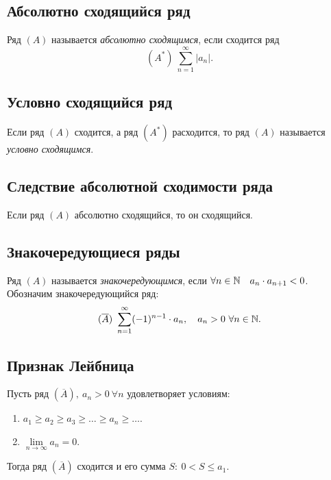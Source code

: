 \subsection{Абсолютно сходящийся ряд}

\begin{definition}
    Ряд $(A)$ называется \emph{абсолютно сходящимся}, если сходится ряд
    \[
        (A^*) \ \sum_{n=1}^{\infty}|a_n|.
    \]
\end{definition}

\subsection{Условно сходящийся ряд}

\begin{definition}
    Если ряд $(A)$ сходится, а ряд $(A^*)$ расходится, то ряд $(A)$ называется \emph{условно сходящимся}.
\end{definition}

\subsection{Следствие абсолютной сходимости ряда}

\begin{statement}
    Если ряд $(A)$ абсолютно сходящийся, то он сходящийся.
\end{statement}

\subsection{Знакочередующиеся ряды}

\begin{definition}
    Ряд $(A)$ называется \emph{знакочередующимся}, если $\forall n \in \mathbb{N} \quad a_n \cdot a_{n+1} < 0$. Обозначим знакочередующийся ряд:
    \[
        (\overline{A}) \ \sum_{n=1}^{\infty}(-1)^{n-1}\cdot a_n, \quad a_n > 0 \ \forall n \in\N.
    \]
\end{definition}

\subsection{Признак Лейбница}

\begin{theorem}
    Пусть ряд $(\overline{A}), \ a_n > 0 \ \forall n$ удовлетворяет условиям:
    \begin{enumerate}
        \item $a_1 \geqslant a_2 \geqslant a_3 \geqslant \ldots \geqslant a_n \geqslant \ldots$.
        \item $\underset{n\rightarrow\infty}{\lim} a_n = 0$.
    \end{enumerate}

    Тогда ряд $(\overline{A})$ сходится и его сумма $S: \ 0 < S \leqslant a_1$.
\end{theorem}

